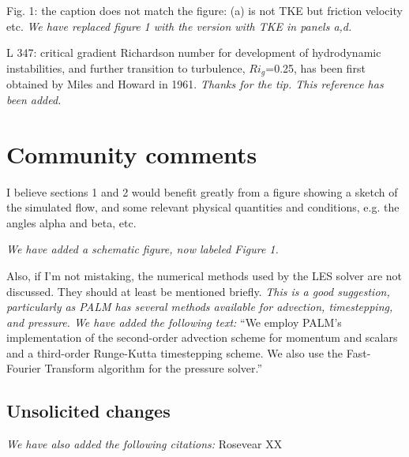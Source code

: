 \documentclass[tc, manuscript]{copernicus}
\begin{document}
Fig. 1: the caption does not match the figure: (a) is not TKE but friction velocity etc.
\textit{We have replaced figure 1 with the version with TKE in panels a,d.}

L 347: critical gradient Richardson number for development of hydrodynamic instabilities, and further transition to turbulence, $Ri_g$=0.25, has been first obtained by Miles and Howard in 1961.
\textit{Thanks for the tip. This reference has been added.}

\section{Community comments}
I believe sections 1 and 2 would benefit greatly from a figure showing a sketch of the simulated flow, and some relevant physical quantities and conditions, e.g. the angles alpha and beta, etc.

\textit{We have added a schematic figure, now labeled Figure 1.}

Also, if I'm not mistaking, the numerical methods used by the LES solver are not discussed. They should at least be mentioned briefly.
\textit{This is a good suggestion, particularly as PALM has several methods available for advection, timestepping, and pressure. We have added the following text:}
``We employ PALM's implementation of the \citet{piacsek_conservation_1970} second-order advection scheme for momentum and scalars and a third-order Runge-Kutta timestepping scheme. We also use the \citet{temperton_generalized_1992} Fast-Fourier Transform algorithm for the pressure solver.''

\subsection{Unsolicited changes}
\textit{We have also added the following citations:}
Rosevear XX
\end{document}
